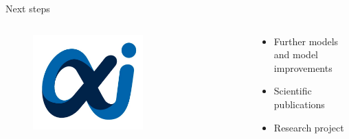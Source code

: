 \documentclass[aspectratio=169]{beamer}
\begin{document}
\begin{frame}{Next steps}
    \pause
    \begin{columns}[T]
        \begin{column}{0.3\textwidth}
            \begin{figure}[H]
                \centering
                \includegraphics[width=0.6\textwidth]{./tex_images/mathai_alfa.jpg}
            \end{figure}
        \end{column}
        \pause
        \begin{column}{0.65\textwidth}
            \vspace*{0.5cm}
            \begin{itemize}
                \item Further models and model improvements
                \item Scientific publications
                \item Research project
            \end{itemize}
        \end{column}
    \end{columns}
    \pause


\end{frame}
\end{document}
